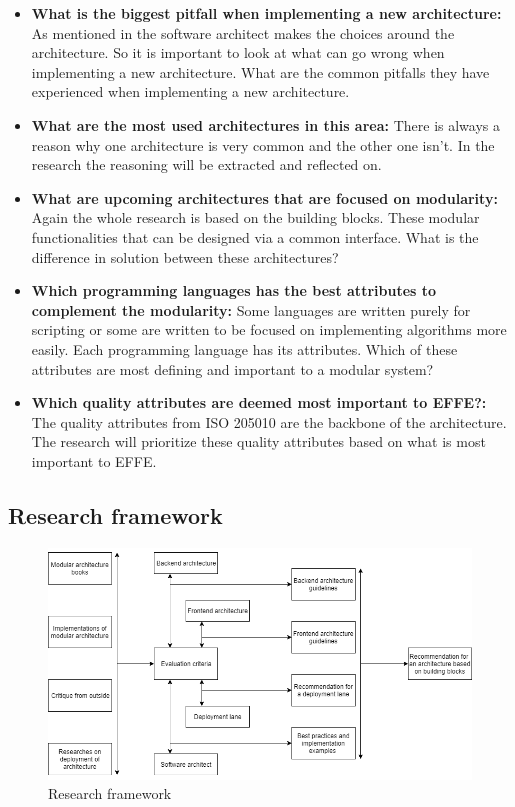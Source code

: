 \begin{itemize}
	\item \textbf{What is the biggest pitfall when implementing a new architecture: }As mentioned in  the software architect makes the choices around the architecture. So it is important to look at what can go wrong when implementing a new architecture. What are the common pitfalls they have experienced when implementing a new architecture.

	\item \textbf{What are the most used architectures in this area: }There is always a reason why one architecture is very common and the other one isn't. In the research the reasoning will be extracted and reflected on.

	\item \textbf{What are upcoming architectures that are focused on modularity: }Again the whole research is based on the building blocks. These modular functionalities that can be designed via a common interface. What is the difference in solution between these architectures?

	\item \textbf{Which programming languages has the best attributes to complement the modularity: }Some languages are written purely for scripting or some are written to be focused on implementing algorithms more easily. Each programming language has its attributes. Which of these attributes are most defining and important to a modular system?

	\item \textbf{Which quality attributes are deemed most important to EFFE?: }The quality attributes from ISO 205010 \cite{iso25010} are the backbone of the architecture. The research will prioritize these quality attributes based on what is most important to EFFE.
\end{itemize}

\subsection{Research framework}

\begin{figure}[H]
	\includegraphics[width=\linewidth]{research_framework.png}
	\caption{Research framework}
\end{figure}

